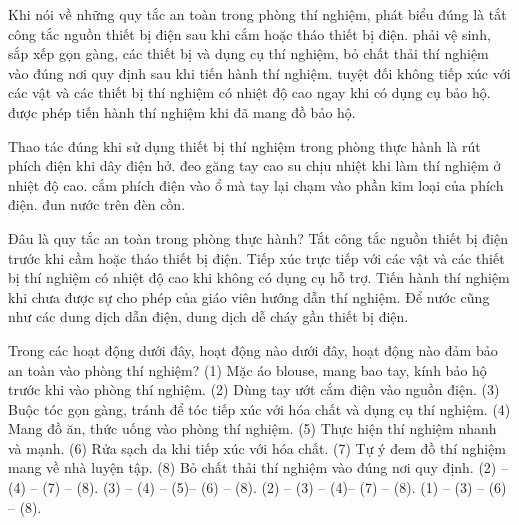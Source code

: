 \begin{ex}
Khi nói về những quy tắc an toàn trong phòng thí nghiệm, phát biểu đúng là
\choice
{tắt công tắc nguồn thiết bị điện sau khi cắm hoặc tháo thiết bị điện.}
{\True phải vệ sinh, sắp xếp gọn gàng, các thiết bị và dụng cụ thí nghiệm, bỏ chất thải thí nghiệm vào đúng nơi quy định sau khi tiến hành thí nghiệm.}
{tuyệt đối không tiếp xúc với các vật và các thiết bị thí nghiệm có nhiệt độ cao ngay khi có dụng cụ bảo hộ.}
{được phép tiến hành thí nghiệm khi đã mang đồ bảo hộ.}
\end{ex}

\begin{ex}
Thao tác đúng khi sử dụng thiết bị thí nghiệm trong phòng thực hành là
\choice
{rút phích điện khi dây điện hở.}
{\True đeo găng tay cao su chịu nhiệt khi làm thí nghiệm ở nhiệt độ cao.}
{cắm phích điện vào ổ mà tay lại chạm vào phần kim loại của phích điện.}
{đun nước trên đèn cồn.}
\end{ex}

\begin{ex}
Đâu là quy tắc an toàn trong phòng thực hành?
\choice
{\True Tắt công tắc nguồn thiết bị điện trước khi cầm hoặc tháo thiết bị điện.}
{Tiếp xúc trực tiếp với các vật và các thiết bị thí nghiệm có nhiệt độ cao khi không có dụng cụ hỗ trợ.}
{Tiến hành thí nghiệm khi chưa được sự cho phép của giáo viên hướng dẫn thí nghiệm.}
{Để nước cũng như các dung dịch dẫn điện, dung dịch dễ cháy gần thiết bị điện.}
\end{ex}

\begin{ex}
Trong các hoạt động dưới đây, hoạt động nào dưới đây, hoạt động nào đảm bảo an toàn vào phòng thí nghiệm?
(1) Mặc áo blouse, mang bao tay, kính bảo hộ trước khi vào phòng thí nghiệm.
(2) Dùng tay ướt cắm điện vào nguồn điện.
(3) Buộc tóc gọn gàng, tránh để tóc tiếp xúc với hóa chất và dụng cụ thí nghiệm.
(4) Mang đồ ăn, thức uống vào phòng thí nghiệm.
(5) Thực hiện thí nghiệm nhanh và mạnh.
(6) Rửa sạch da khi tiếp xúc với hóa chất.
(7) Tự ý đem đồ thí nghiệm mang về nhà luyện tập.
(8) Bỏ chất thải thí nghiệm vào đúng nơi quy định.
\choice
{(2) – (4) – (7) – (8).}
{(3) – (4) – (5)– (6) – (8).}
{(2) – (3) – (4)– (7) – (8).}
{\True (1) – (3) – (6) – (8).}
\end{ex}

